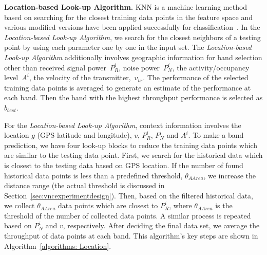 
{\bf Location-based Look-up Algorithm.} KNN is a machine learning method
based on searching for the closest training data points in the feature space and various
modified versions have been applied successfully for classification~\cite{zhang2006svm}.
In the {\it Location-based Look-up Algorithm}, we search for the closest neighbors of 
a testing point by using each parameter one by one in the input set. 
The {\it Location-based Look-up Algorithm} additionally involves geographic information for band selection other than received signal power~$P_R^i$, noise power~$P_N^i$, the activity/occupancy level~$A^i$, the velocity of the transmitter,~$v_{tx}$.
The 
performance of the selected training data points is averaged to generate an estimate of the performance at each band. Then
the band with the highest throughput performance is selected as $b_{best}$.

For the {\it Location-based Look-up Algorithm}, 
context information involves the location $g$ (GPS latitude and longitude), $v$, $P_R^i$, $P_N^i$ 
and $A^i$. To make a band prediction, we have four look-up blocks to reduce
the training data points which are similar to the testing data point. First,
we search for the historical data which is closest to the testing data based on GPS location.
If the number of found historical data points is less than a predefined threshold, 
 $\theta_{AArea}$, we increase the distance range (the actual threshold is discussed in 
Section~\ref{sec:vncexperimentdesign}). Then, based on the filtered historical data,
we collect $\theta_{AArea}$ data points which are closest to $P_R^i$, where $\theta_{AArea}$ is the threshold of the number of collected data points. 
A similar process is repeated based on $P_N^i$ and $v$, respectively.
After deciding the final data set, we average the throughput of data points at each band.
This algorithm's key steps are shown in Algorithm~\ref{algorithms: Location}.


